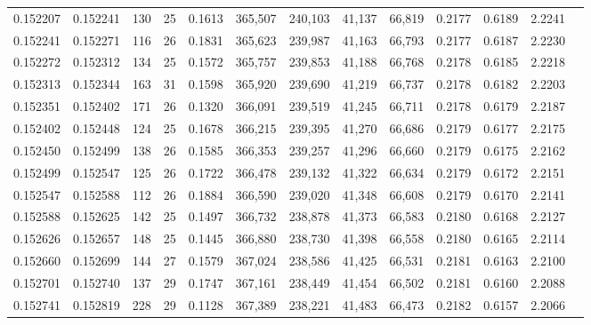 \begin{tabular}{rrrrrrrrrrrrr}
0.152207 & 0.152241 & 130 &  25 &                                     0.1613 & 365,507 & 240,103 &  41,137 &  66,819 & 0.2177 & 0.6189 & 2.2241 \\
0.152241 & 0.152271 & 116 &  26 &                                     0.1831 & 365,623 & 239,987 &  41,163 &  66,793 & 0.2177 & 0.6187 & 2.2230 \\
0.152272 & 0.152312 & 134 &  25 &                                     0.1572 & 365,757 & 239,853 &  41,188 &  66,768 & 0.2178 & 0.6185 & 2.2218 \\
0.152313 & 0.152344 & 163 &  31 &                                     0.1598 & 365,920 & 239,690 &  41,219 &  66,737 & 0.2178 & 0.6182 & 2.2203 \\
0.152351 & 0.152402 & 171 &  26 &                                     0.1320 & 366,091 & 239,519 &  41,245 &  66,711 & 0.2178 & 0.6179 & 2.2187 \\
0.152402 & 0.152448 & 124 &  25 &                                     0.1678 & 366,215 & 239,395 &  41,270 &  66,686 & 0.2179 & 0.6177 & 2.2175 \\
0.152450 & 0.152499 & 138 &  26 &                                     0.1585 & 366,353 & 239,257 &  41,296 &  66,660 & 0.2179 & 0.6175 & 2.2162 \\
0.152499 & 0.152547 & 125 &  26 &                                     0.1722 & 366,478 & 239,132 &  41,322 &  66,634 & 0.2179 & 0.6172 & 2.2151 \\
0.152547 & 0.152588 & 112 &  26 &                                     0.1884 & 366,590 & 239,020 &  41,348 &  66,608 & 0.2179 & 0.6170 & 2.2141 \\
0.152588 & 0.152625 & 142 &  25 &                                     0.1497 & 366,732 & 238,878 &  41,373 &  66,583 & 0.2180 & 0.6168 & 2.2127 \\
0.152626 & 0.152657 & 148 &  25 &                                     0.1445 & 366,880 & 238,730 &  41,398 &  66,558 & 0.2180 & 0.6165 & 2.2114 \\
0.152660 & 0.152699 & 144 &  27 &                                     0.1579 & 367,024 & 238,586 &  41,425 &  66,531 & 0.2181 & 0.6163 & 2.2100 \\
0.152701 & 0.152740 & 137 &  29 &                                     0.1747 & 367,161 & 238,449 &  41,454 &  66,502 & 0.2181 & 0.6160 & 2.2088 \\
0.152741 & 0.152819 & 228 &  29 &                                     0.1128 & 367,389 & 238,221 &  41,483 &  66,473 & 0.2182 & 0.6157 & 2.2066 \\

\end{tabular}
